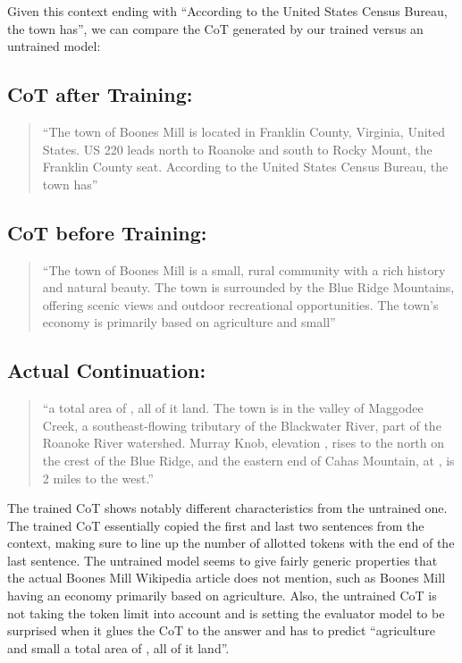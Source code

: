 \documentclass{article}
\begin{document}
Given this context ending with ``According to the United States Census Bureau, the town has'', we can compare the CoT generated by our trained versus an untrained model:

\subsection{CoT after Training:}
\begin{quote}
``The town of Boones Mill is located in Franklin County, Virginia, United States. US 220 leads north to Roanoke and south to Rocky Mount, the Franklin County seat. According to the United States Census Bureau, the town has''
\end{quote}

\subsection{CoT before Training:}
\begin{quote}
``The town of Boones Mill is a small, rural community with a rich history and natural beauty. The town is surrounded by the Blue Ridge Mountains, offering scenic views and outdoor recreational opportunities. The town's economy is primarily based on agriculture and small''
\end{quote}

\subsection{Actual Continuation:}
\begin{quote}
``a total area of , all of it land. The town is in the valley of Maggodee Creek, a southeast-flowing tributary of the Blackwater River, part of the Roanoke River watershed. Murray Knob, elevation , rises  to the north on the crest of the Blue Ridge, and the eastern end of Cahas Mountain, at , is 2 miles to the west.''
\end{quote}

The trained CoT shows notably different characteristics from the untrained one. The trained CoT essentially copied the first and last two sentences from the context, making sure to line up the number of allotted tokens with the end of the last sentence. The untrained model seems to give fairly generic properties that the actual Boones Mill Wikipedia article does not mention, such as Boones Mill having an economy primarily based on agriculture. Also, the untrained CoT is not taking the token limit into account and is setting the evaluator model to be surprised when it glues the CoT to the answer and has to predict ``agriculture and small a total area of , all of it land''.
\end{document}

